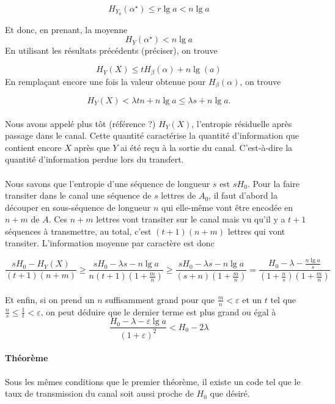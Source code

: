 	\[H_{Y_0}(\alpha^\star) \le r\lg a < n\lg a\]
	
	Et donc, en prenant, la moyenne 
	\[H_Y(\alpha^\star) < n \lg a\]
	En utilisant les résultats précédents (préciser), on trouve
	
	\[H_Y(X)\le t H_\beta(\alpha) + n \lg(a)\]
	En remplaçant encore une fois la valeur obtenue pour $H_\beta(\alpha)$, on trouve
	
	\[H_Y(X)<\lambda t n + n \lg a \le \lambda s+n \lg a.\]
	
	\paragraph{}
	Nous avons appelé plus tôt (référence ?) $H_Y(X)$, l'entropie résiduelle après passage dans le canal. Cette quantité caractérise la quantité d'information
	que contient encore $X$ après que $Y$ ai été reçu à la sortie du canal. C'est-à-dire la quantité d'information perdue lors du transfert.
	
	\paragraph{}
	Nous savons que l'entropie d'une séquence de longueur $s$ est $sH_0$. Pour la faire transiter dans le canal une séquence de $s$ lettres de $A_0$, il faut d'abord la découper en sous-séquence de 
	longueur $n$ qui elle-même vont être encodée en $n+m$ de $A$. Ces $n+m$ lettres vont transiter sur le canal mais vu qu'il y a $t+1$ séquences à transmettre,
	au total, c'est $(t+1)(n+m)$ lettres qui vont transiter. L'information moyenne par caractère est donc
	
	\[\frac{sH_0-H_Y(X)}{(t+1)(n+m)} \ge \frac{sH_0-\lambda s-n\lg a}{n(t+1)(1+\frac{m}{n})} \ge 
	\frac{sH_0-\lambda s-n\lg a}{(s+n)(1+\frac{m}{n})} = \frac{H_0-\lambda-\frac{n\lg a}{s}}{(1+\frac{n}{s})(1+\frac{m}{n})}\]
	
	\paragraph{}
	Et enfin, si on prend un $n$ suffisamment grand pour que $\frac{m}{n}<\varepsilon$ et un $t$ tel que $\frac{n}{s} \le \frac{1}{t} < \varepsilon$, on peut 
	déduire que le dernier terme est plus grand ou égal à
	\[\frac{H_0-\lambda-\varepsilon\lg a}{(1+\varepsilon)^2}<H_0-2\lambda\]
	
	
	
	
	
	
	
	
	\paragraph{Théorème}
	Sous les mêmes conditions que le premier théorème, il existe un code tel que le taux de transmission du canal soit aussi proche de $H_0$ que désiré.

